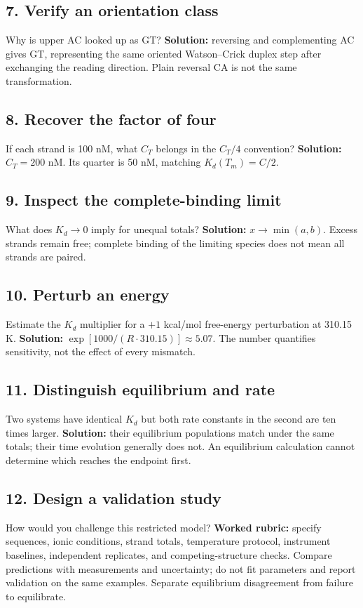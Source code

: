 \subsection*{7. Verify an orientation class}
Why is upper AC looked up as GT?
\textbf{Solution:} reversing and complementing AC gives GT, representing
the same oriented Watson--Crick duplex step after exchanging the reading direction.
Plain reversal CA is not the same transformation.

\subsection*{8. Recover the factor of four}
If each strand is 100 nM, what $C_T$ belongs in the $C_T/4$ convention?
\textbf{Solution:} $C_T=200$ nM. Its quarter is 50 nM, matching
$K_d(T_m)=C/2$.

\subsection*{9. Inspect the complete-binding limit}
What does $K_d\to0$ imply for unequal totals?
\textbf{Solution:} $x\to\min(a,b)$. Excess strands remain free;
complete binding of the limiting species does not mean all strands are paired.

\subsection*{10. Perturb an energy}
Estimate the $K_d$ multiplier for a $+1$ kcal/mol free-energy perturbation
at 310.15 K. \textbf{Solution:} $\exp[1000/(R\cdot310.15)]\approx5.07$.
The number quantifies sensitivity, not the effect of every mismatch.

\subsection*{11. Distinguish equilibrium and rate}
Two systems have identical $K_d$ but both rate constants in the second
are ten times larger. \textbf{Solution:} their equilibrium populations
match under the same totals; their time evolution generally does not.
An equilibrium calculation cannot determine which reaches the endpoint first.

\subsection*{12. Design a validation study}
How would you challenge this restricted model?
\textbf{Worked rubric:} specify sequences, ionic conditions, strand totals,
temperature protocol, instrument baselines, independent replicates, and
competing-structure checks. Compare predictions with measurements and
uncertainty; do not fit parameters and report validation on the same examples.
Separate equilibrium disagreement from failure to equilibrate.
